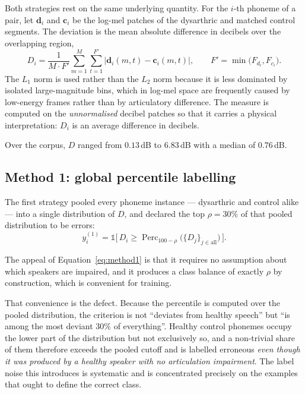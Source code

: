 Both strategies rest on the same underlying quantity. For the $i$-th phoneme of
a pair, let $\mathbf{d}_i$ and $\mathbf{c}_i$ be the log-mel patches of the
dysarthric and matched control segments. The deviation is the mean absolute
difference in decibels over the overlapping region,
\begin{equation}
D_i = \frac{1}{M \cdot F'} \sum_{m=1}^{M} \sum_{t=1}^{F'}
      \bigl| \mathbf{d}_i(m,t) - \mathbf{c}_i(m,t) \bigr|,
\qquad F' = \min\bigl(F_{d_i}, F_{c_i}\bigr).
\label{eq:distance}
\end{equation}
The $L_1$ norm is used rather than the $L_2$ norm because it is less dominated
by isolated large-magnitude bins, which in log-mel space are frequently caused
by low-energy frames rather than by articulatory difference. The measure is
computed on the \emph{unnormalised} decibel patches so that it carries a
physical interpretation: $D_i$ is an average difference in decibels.

Over the corpus, $D$ ranged from $0.13$\,dB to $6.83$\,dB with a median of
$0.76$\,dB.

\subsection{Method 1: global percentile labelling}
\label{sec:method1}

The first strategy pooled every phoneme instance --- dysarthric and control
alike --- into a single distribution of $D$, and declared the top
$\rho = 30\%$ of that pooled distribution to be errors:
\begin{equation}
y_i^{(1)} = \mathbb{1}\bigl[\,D_i \geq \operatorname{Perc}_{100-\rho}\bigl(\{D_j\}_{j \in \text{all}}\bigr)\,\bigr].
\label{eq:method1}
\end{equation}

The appeal of Equation~\eqref{eq:method1} is that it requires no assumption
about which speakers are impaired, and it produces a class balance of exactly
$\rho$ by construction, which is convenient for training.

That convenience is the defect. Because the percentile is computed over the
pooled distribution, the criterion is not ``deviates from healthy speech'' but
``is among the most deviant $30\%$ of everything''. Healthy control phonemes
occupy the lower part of the distribution but not exclusively so, and a
non-trivial share of them therefore exceeds the pooled cutoff and is labelled
erroneous \emph{even though it was produced by a healthy speaker with no
articulation impairment}. The label noise this introduces is systematic and is
concentrated precisely on the examples that ought to define the correct class.

